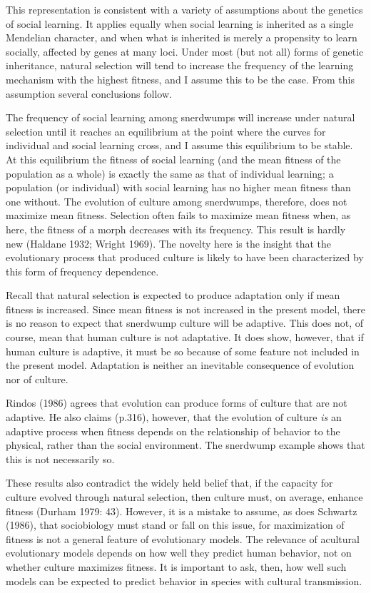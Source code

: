 \documentclass[11pt]{article}
\begin{document}
This representation is consistent with a variety of assumptions about the
genetics of social learning.  It applies equally when social learning is
inherited as a single Mendelian character, and when what is inherited is
merely a propensity to learn socially, affected by genes at many loci.
Under most (but not all) forms of genetic inheritance, natural selection
will tend to increase the frequency of the learning mechanism with the
highest fitness, and I assume this to be the case.  From this
assumption several conclusions follow. 

The frequency of social learning among snerdwumps will increase
under natural selection until it reaches an equilibrium at the point where
the curves for individual and social learning cross, and I assume this
equilibrium to be stable.  At this equilibrium the fitness of social
learning (and the mean fitness of the population as a whole) is exactly
the same as that of individual learning; a population (or individual) with
social learning has no higher mean fitness than one without.  The
evolution of culture among snerdwumps, therefore, does not maximize
mean fitness.  
Selection often fails to maximize mean fitness when, as here, the fitness
of a morph decreases with its frequency.  This result is hardly new
(Haldane 1932; Wright 1969).  The novelty here is the
insight that the evolutionary process that produced culture is likely to
have been characterized by this form of frequency dependence.

Recall that natural selection is expected to produce adaptation only if
mean fitness is increased.  Since mean fitness is not increased in the
present model, there is no reason to expect that snerdwump culture will be
adaptive.  This does not, of course, mean that human culture is not
adaptative.  It does show, however, that if human culture is adaptive, it
must be so because of some feature not included in the present model.
Adaptation is neither an inevitable consequence of evolution nor of
culture.

Rindos (1986) agrees that evolution can produce forms of culture
that are not adaptive.  He also claims (p.316), however, that the
evolution of culture \emph{is} an adaptive process when fitness depends on
the relationship of behavior to the physical, rather than the social
environment.  The snerdwump example shows that this is not necessarily so.

These results also contradict the widely held belief that, if the capacity
for culture evolved through natural selection, then culture must, on
average, enhance fitness (Durham 1979: 43).  However, it is a mistake to
assume, as does Schwartz (1986), that sociobiology must stand or fall on
this issue, for maximization of fitness is not a general feature of
evolutionary models.  The relevance of acultural evolutionary models
depends on how well they predict human behavior, not on whether culture
maximizes fitness.  It is important to ask, then, how well such models can
be expected to predict behavior in species with cultural transmission. 
\end{document}
